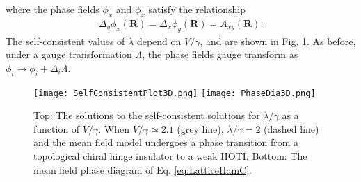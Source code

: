 \documentclass[prb,aps,twocolumn,groupaddress,floatfix]{revtex4-1}
\begin{document}
where the phase fields $\phi_x$ and $\phi_x$ satisfy the relationship
\begin{equation}
\begin{split}
\Delta_y\phi_x(\bm{R}) = \Delta_x\phi_y(\bm{R}) = A_{xy}(\bm{R}).
\end{split}\label{eq:PhaseCont3DC}
\end{equation}
The self-consistent values of $\lambda$ depend on $V/\gamma$, and are shown in Fig. \ref{fig:SelfConsistentPlot}. As before, under a gauge transformation $\Lambda$, the phase fields gauge transform as $\phi_i \rightarrow \phi_i + \Delta_i \Lambda$.


\begin{figure}
\texttt{[image: SelfConsistentPlot3D.png]}
\texttt{[image: PhaseDia3D.png]}
\caption{Top: The solutions to the self-consistent solutions for $\lambda/\gamma$ as a function of $V/\gamma$. When $V/\gamma \simeq 2.1$ (grey line), $\lambda/\gamma = 2$ (dashed line) and the mean field model undergoes a phase transition from a topological chiral hinge insulator to a weak HOTI. Bottom: The mean field phase diagram of Eq. \ref{eq:LatticeHamC}.}
\label{fig:SelfConsistentPlot}
\end{figure}
\end{document}
